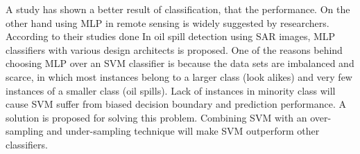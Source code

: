 A study has shown a better result of classification,  that the performance. On the other hand using MLP in remote sensing is widely suggested by researchers\cite{Mera201472,Brekke200595,fingas2014review}. According to their studies done In oil spill detection using SAR images, MLP classifiers with various design architects is proposed. One of the reasons behind choosing MLP over an SVM classifier is because the data sets are imbalanced and scarce, in which most instances belong to a larger class (look alikes) and very few instances of a smaller class (oil spills). Lack of instances in minority class will cause SVM suffer from biased decision boundary and prediction performance. A solution is proposed for solving this problem. 
Combining SVM with an over-sampling and under-sampling technique will make SVM outperform other classifiers\cite{liu2006boosting}.


